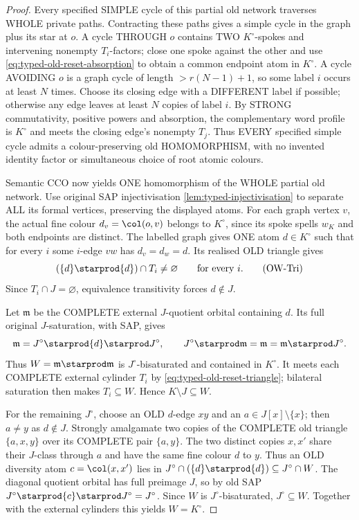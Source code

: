 \begin{proof}
Every specified SIMPLE cycle of this
partial old network traverses WHOLE
private paths. Contracting these
paths gives a simple cycle in the
graph plus its star at $o$.
A cycle THROUGH $o$ contains TWO
$K^\circ$-spokes and intervening
nonempty $T_i$-factors; close one
spoke against the other and use
\eqref{eq:typed-old-reset-absorption}
to obtain a common endpoint atom
in $K^\circ$. A cycle AVOIDING $o$
is a graph cycle of length
$>r(N-1)+1$, so some label $i$
occurs at least $N$ times.
Choose its closing edge with a
DIFFERENT label if possible;
otherwise any edge leaves at
least $N$ copies of label $i$.
By STRONG commutativity, positive
powers and absorption, the
complementary word profile is
$K^\circ$ and meets the closing
edge's nonempty $T_j$.
Thus EVERY specified simple cycle
admits a colour-preserving old
HOMOMORPHISM, with no invented
identity factor or simultaneous
choice of root atomic colours.

Semantic CCO now yields ONE
homomorphism of the WHOLE partial
old network. Use original SAP
injectivisation
\cref{lem:typed-injectivisation}
to separate ALL its formal vertices,
preserving the displayed atoms.
For each graph vertex $v$, the
actual fine colour
$d_v=\col(o,v)$ belongs to
$K^\circ$, since its spoke
spells $w_K$ and both endpoints
are distinct. The labelled
graph gives ONE atom $d\in K^\circ$
such that for every $i$ some
$i$-edge $vw$ has
$d_v=d_w=d$. Its realised OLD
triangle gives
\[
       (\{d\}\starprod\{d\})\cap T_i
                      \ne\varnothing
              \qquad\text{for every }i.
\tag{OW-Tri}\label{eq:typed-old-reset-triangle}
\]
Since $T_i\cap J=\varnothing$,
equivalence transitivity forces
$d\notin J$.

Let $\mathfrak m$ be the COMPLETE
external $J$-quotient orbital
containing $d$. Its full original
$J$-saturation, with SAP, gives
\[
 \mathfrak m=J^\circ\starprod\{d\}
                          \starprod J^\circ,
 \qquad
 J^\circ\starprod\mathfrak m
       =\mathfrak m
       =\mathfrak m\starprod J^\circ.
\]
Thus $W=\mathfrak m\starprod\mathfrak m$
is $J^\circ$-bisaturated and
contained in $K^\circ$. It meets
each COMPLETE external cylinder
$T_i$ by \eqref{eq:typed-old-reset-triangle};
bilateral saturation then makes
$T_i\subseteq W$. Hence
$K\setminus J\subseteq W$.

For the remaining $J^\circ$,
choose an OLD $d$-edge $xy$ and
an $a\in J[x]\setminus\{x\}$;
then $a\ne y$ as $d\notin J$.
Strongly amalgamate two copies
of the COMPLETE old triangle
$\{a,x,y\}$ over its COMPLETE
pair $\{a,y\}$. The two distinct
copies $x,x'$ share their $J$-class
through $a$ and have the same
fine colour $d$ to $y$.
Thus an OLD diversity atom
$c=\col(x,x')$ lies in
$J^\circ\cap(\{d\}\starprod\{d\})
\subseteq J^\circ\cap W$.
The diagonal quotient orbital
has full preimage $J$, so by
old SAP
$J^\circ\starprod\{c\}
\starprod J^\circ=J^\circ$.
Since $W$ is $J^\circ$-bisaturated,
$J^\circ\subseteq W$.
Together with the external
cylinders this yields $W=K^\circ$.


\end{proof}
